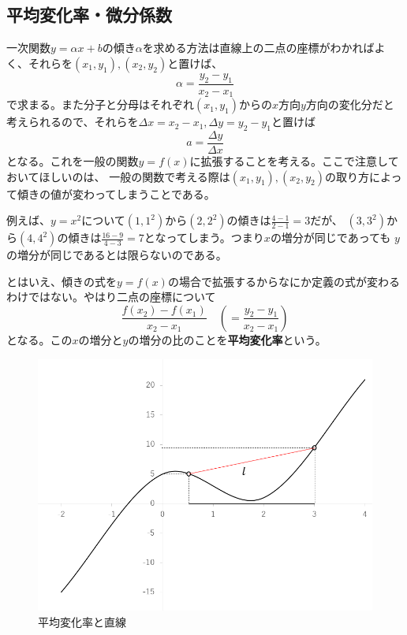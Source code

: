 \documentclass[a4j,dvipdfmx]{jsarticle}
\begin{document}
        \subsection{平均変化率・微分係数}
            一次関数$y=\alpha x+b$の傾き$\alpha$を求める方法は直線上の二点の座標がわかればよく、それらを$(x_1,y_1),(x_2,y_2)$と置けば、
            \begin{equation}
                \alpha=\frac{y_2-y_1}{x_2-x_1}
            \end{equation}
            で求まる。また分子と分母はそれぞれ$(x_1,y_1)$からの$x$方向$y$方向の変化分だと考えられるので、それらを$\Delta x=x_2-x_1,\Delta y=y_2-y_1$と置けば
            \begin{equation}
                a= \frac{\Delta y}{\Delta x}
            \end{equation}
            となる。これを一般の関数$y=f(x)$に拡張することを考える。ここで注意しておいてほしいのは、
            一般の関数で考える際は$(x_1,y_1),(x_2,y_2)$の取り方によって傾きの値が変わってしまうことである。

            例えば、$y=x^2$について$(1,1^2)$から$(2,2^2)$の傾きは$\frac{4-1}{2-1}=3$だが、
            $(3,3^2)$から$(4,4^2)$の傾きは$\frac{16-9}{4-3}=7$となってしまう。つまり$x$の増分が同じであっても
            $y$の増分が同じであるとは限らないのである。

            とはいえ、傾きの式を$y=f(x)$の場合で拡張するからなにか定義の式が変わるわけではない。やはり二点の座標について
            \begin{equation}
                \frac{f(x_2)-f(x_1)}{x_2-x_1}\quad\left(=\frac{y_2-y_1}{x_2-x_1}\right)
            \end{equation}
            となる。この$x$の増分と$y$の増分の比のことを\textbf{平均変化率}という。
            \begin{figure}[h]
                \centering
                \includegraphics[scale=0.3]{img/QuuNote/heikinhenkaritu.png}
                \caption{平均変化率と直線}
            \end{figure}
\end{document}
